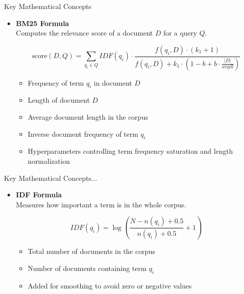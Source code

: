 \begin{frame}{Key Mathematical Concepts}
    \begin{itemize}
        \item \textbf{BM25 Formula} \\
        Computes the relevance score of a document $D$ for a query $Q$.
        
        \begin{center}
        \small
        $$
        \text{score}(D, Q) = \sum_{q_i \in Q} 
        IDF(q_i) \cdot 
        \frac{f(q_i, D) \cdot (k_1 + 1)}{f(q_i, D) + k_1 \cdot \left(1 - b + b \cdot \frac{|D|}{\text{avgdl}}\right)}
        $$
        \end{center}
        
        \begin{itemize}
            \item[$f(q_i, D)$:] Frequency of term $q_i$ in document $D$  
            \item[$|D|$:] Length of document $D$  
            \item[$\text{avgdl}$:] Average document length in the corpus  
            \item[$IDF(q_i)$:] Inverse document frequency of term $q_i$  
            \item[$k_1, b$:] Hyperparameters controlling term frequency saturation and length normalization
        \end{itemize}
    \end{itemize}
    \vspace{0.3cm}
\end{frame}

\begin{frame}{Key Mathematical Concepts...}
    \begin{itemize}
        \item \textbf{IDF Formula} \\
        Measures how important a term is in the whole corpus.
        
        \begin{center}
        \Large
        $$
        IDF(q_i) = \log \left( \frac{N - n(q_i) + 0.5}{n(q_i) + 0.5} + 1 \right)
        $$
        \end{center}
        
        \begin{itemize}
            \item[$N$:] Total number of documents in the corpus  
            \item[$n(q_i)$:] Number of documents containing term $q_i$  
            \item[+1:] Added for smoothing to avoid zero or negative values
        \end{itemize}
    \end{itemize}
    \vspace{0.3cm}
\end{frame}

